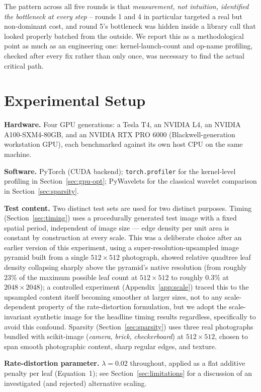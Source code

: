 \documentclass[11pt]{article}
\begin{document}
The pattern across all five rounds is that \emph{measurement, not
intuition, identified the bottleneck at every step} -- rounds 1 and 4 in
particular targeted a real but non-dominant cost, and round 5's bottleneck
was hidden inside a library call that looked properly batched from the
outside. We report this as a methodological point as much as an engineering
one: kernel-launch-count and op-name profiling, checked after every fix
rather than only once, was necessary to find the actual critical path.

\section{Experimental Setup}
\label{sec:setup}

\textbf{Hardware.} Four GPU generations: a Tesla T4, an NVIDIA L4, an
NVIDIA A100-SXM4-80GB, and an NVIDIA RTX PRO 6000 (Blackwell-generation
workstation GPU), each benchmarked against its own host CPU on the same
machine.

\textbf{Software.} PyTorch (CUDA backend); \texttt{torch.profiler} for the
kernel-level profiling in Section~\ref{sec:gpu-opt}; PyWavelets for the
classical wavelet comparison in Section~\ref{sec:sparsity}.

\textbf{Test content.} Two distinct test sets are used for two distinct
purposes. Timing (Section~\ref{sec:timing}) uses a procedurally generated
test image with a fixed spatial period, independent of image size --- edge
density per unit area is constant by construction at every scale. This was a
deliberate choice after an earlier version of this experiment, using a
super-resolution-upsampled image pyramid built from a single $512\times512$
photograph, showed relative quadtree leaf density collapsing sharply above
the pyramid's native resolution (from roughly 23\% of the maximum possible
leaf count at $512\times512$ to roughly 0.3\% at $2048\times2048$); a
controlled experiment (Appendix~\ref{app:scale}) traced this to the
upsampled content itself becoming smoother at larger sizes, not to any
scale-dependent property of the rate-distortion formulation, but we adopt
the scale-invariant synthetic image for the headline timing results
regardless, specifically to avoid this confound. Sparsity
(Section~\ref{sec:sparsity}) uses three real photographs bundled with
scikit-image (\emph{camera}, \emph{brick}, \emph{checkerboard}) at
$512\times512$, chosen to span smooth photographic content, sharp regular
edges, and texture.

\textbf{Rate-distortion parameter.} $\lambda = 0.02$ throughout, applied as
a flat additive penalty per leaf (Equation~1); see
Section~\ref{sec:limitations} for a discussion of an investigated (and
rejected) alternative scaling.
\end{document}

